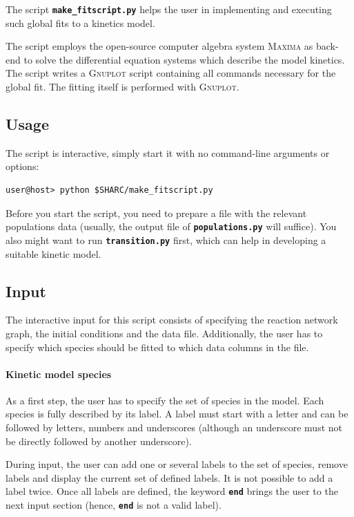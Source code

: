 \documentclass[a4paper,10pt,DIV=15,openany,twoside=false]{scrbook}
\newcommand{\ttt}[1]{\textbf{\texttt{#1}}}
\begin{document}
The script \ttt{make\_fitscript.py} helps the user in implementing and executing such global fits to a kinetics model.

The script employs the open-source computer algebra system \textsc{Maxima} as back-end to solve the differential equation systems which describe the model kinetics.
The script writes a \textsc{Gnuplot} script containing all commands necessary for the global fit. 
The fitting itself is performed with \textsc{Gnuplot}.

\subsection{Usage}

The script is interactive, simply start it with no command-line arguments or options:
\begin{verbatim}
user@host> python $SHARC/make_fitscript.py
\end{verbatim}

Before you start the script, you need to prepare a file with the relevant populations data (usually, the output file of \ttt{populations.py} will suffice).
You also might want to run \ttt{transition.py} first, which can help in developing a suitable kinetic model.

\subsection{Input}

The interactive input for this script consists of specifying the reaction network graph, the initial conditions and the data file.
Additionally, the user has to specify which species should be fitted to which data columns in the file.

\paragraph{Kinetic model species}

As a first step, the user has to specify the set of species in the model.
Each species is fully described by its label.
A label must start with a letter and can be followed by letters, numbers and underscores (although an underscore must not be directly followed by another underscore).

During input, the user can add one or several labels to the set of species, remove labels and display the current set of defined labels.
It is not possible to add a label twice.
Once all labels are defined, the keyword \ttt{end} brings the user to the next input section (hence, \ttt{end} is not a valid label).
\end{document}
